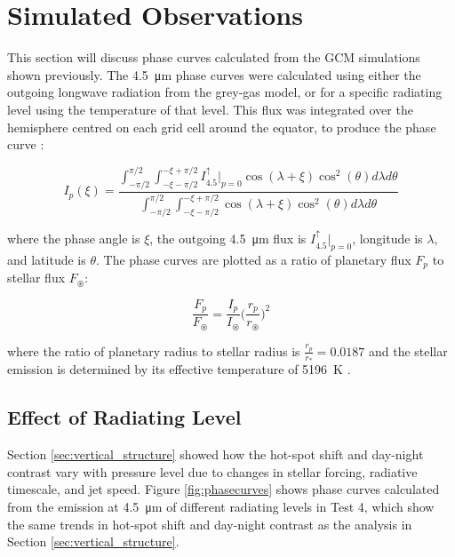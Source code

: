 



\section{Simulated Observations}\label{sec:simulated-obs}

This section will discuss phase curves calculated from the GCM simulations shown previously. The \SI{4.5}{\micro\metre} phase curves were calculated using either the outgoing longwave radiation from the grey-gas model, or for a specific radiating level using the temperature of that level. This flux was integrated over the hemisphere centred on each grid cell around the equator, to produce the phase curve \citep{cowan2008inverting}:

\begin{equation}
  I_{p}(\xi) = \frac{\int_{-\pi/2}^{\pi/2} \int_{-\xi-\pi/2}^{-\xi+\pi/2}I_{4.5}^{\uparrow}|_{p=0}\cos(\lambda+\xi)\cos^{2}(\theta)d \lambda d \theta}{\int_{-\pi/2}^{\pi/2} \int_{-\xi-\pi/2}^{-\xi+\pi/2}\cos(\lambda+\xi)\cos^{2}(\theta)d \lambda d \theta}
\end{equation}

where the phase angle is $\xi$, the outgoing \SI{4.5}{\micro\metre} flux is $I_{4.5}^{\uparrow}|_{p=0}$, longitude is $\lambda$, and latitude is $\theta$. The phase curves are plotted as a ratio of planetary flux $F_{p}$ to stellar flux $F_{\circledast}$:

\begin{equation}
  \frac{F_{p}}{F_{\circledast}} = \frac{I_{p}}{I_{\circledast}}\Big( \frac{r_{p}}{r_{\circledast}} \Big) ^{2}
\end{equation}

where the ratio of planetary radius to stellar radius is $\frac{r_{p}}{r_{*}} = 0.0187$ and the stellar emission is determined by its effective temperature of \SI{5196}{\kelvin} \citep{von201155}.

\subsection{Effect of Radiating Level}

Section \ref{sec:vertical_structure} showed how the hot-spot shift and day-night contrast vary with pressure level due to changes in stellar forcing, radiative timescale, and jet speed. Figure \ref{fig:phasecurves} shows phase curves calculated from the emission at \SI{4.5}{\micro\metre} of different radiating levels in Test 4, which show the same trends in hot-spot shift and day-night contrast as the analysis in Section \ref{sec:vertical_structure}.

